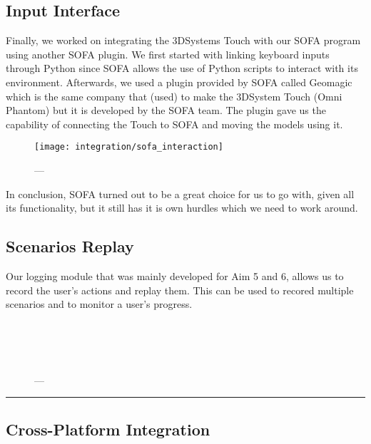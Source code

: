 \subsection{Input Interface}
Finally, we worked on integrating the 3DSystems Touch with our SOFA program using another SOFA plugin. We first started with linking keyboard inputs through Python since SOFA allows the use of Python scripts to interact with its environment. Afterwards, we used a plugin provided by SOFA called Geomagic which is the same company that (used) to make the 3DSystem Touch (Omni Phantom) but it is developed by the SOFA team. The plugin gave us the capability of connecting the Touch to SOFA and moving the models using it.

\begin{figure}
  \centering%
  \texttt{[image: integration/sofa\_interaction]}
  \caption{---}\label{fig:sofa_interaction}
\end{figure}

In conclusion, SOFA turned out to be a great choice for us to go with, given all its functionality, but it still has it is own hurdles which we need to work around.

\subsection{Scenarios Replay}\label{sec:replay}
Our logging module that was mainly developed for Aim 5 and 6, allows us to record the user's actions and replay them. This can be used to recored multiple scenarios and to monitor a user's progress.


\begin{figure}
  \centering%
  \setlength{\fboxsep}{0pt}%
  \setlength{\fboxrule}{0.1pt}%
  \hfill%
  \\[1.5ex]%
  \hfill%
  \\[1.5ex]%
  \hfill%
  \\[1.5ex]%
  \caption{---}\label{fig:cuts}
\end{figure}

\hrule%

\subsection{Cross-Platform Integration}\label{sec:cross}
